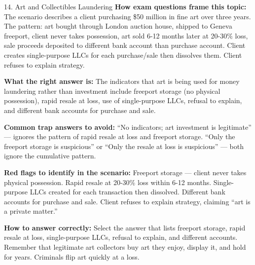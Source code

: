 \documentclass[11pt,a4paper]{beamer}
\begin{document}
	\begin{frame}{14. Art and Collectibles Laundering}
		\tiny
		\noindent\textbf{How exam questions frame this topic:} The scenario describes a client purchasing \$50 million in fine art over three years. The pattern: art bought through London auction house, shipped to Geneva freeport, client never takes possession, art sold 6-12 months later at 20-30\% loss, sale proceeds deposited to different bank account than purchase account. Client creates single-purpose LLCs for each purchase/sale then dissolves them. Client refuses to explain strategy.
		
		\vspace{0.1cm}
		\noindent\textbf{What the right answer is:} The indicators that art is being used for money laundering rather than investment include freeport storage (no physical possession), rapid resale at loss, use of single-purpose LLCs, refusal to explain, and different bank accounts for purchase and sale.
		
		\vspace{0.1cm}
		\noindent\textbf{Common trap answers to avoid:} “No indicators; art investment is legitimate” — ignores the pattern of rapid resale at loss and freeport storage. “Only the freeport storage is suspicious” or “Only the resale at loss is suspicious” — both ignore the cumulative pattern.
		
		\vspace{0.1cm}
		\noindent\textbf{Red flags to identify in the scenario:} Freeport storage — client never takes physical possession. Rapid resale at 20-30\% loss within 6-12 months. Single-purpose LLCs created for each transaction then dissolved. Different bank accounts for purchase and sale. Client refuses to explain strategy, claiming “art is a private matter.”
		
		\vspace{0.1cm}
		\noindent\textbf{How to answer correctly:} Select the answer that lists freeport storage, rapid resale at loss, single-purpose LLCs, refusal to explain, and different accounts. Remember that legitimate art collectors buy art they enjoy, display it, and hold for years. Criminals flip art quickly at a loss.
	\end{frame}
	
\end{document}
